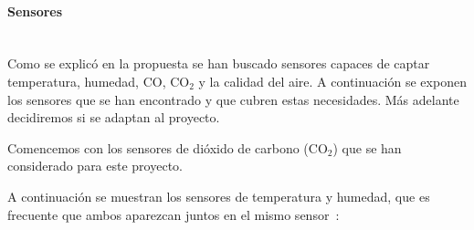 \paragraph{Sensores}\mbox{} \\
Como se explicó en la propuesta se han buscado sensores capaces de captar temperatura, humedad, CO, CO$_2$ y la calidad del aire. A continuación se exponen los sensores que se han encontrado y que cubren estas necesidades. Más adelante decidiremos si se adaptan al proyecto.

Comencemos con los sensores de dióxido de carbono (CO$_2$) que se han considerado para este proyecto.

\begin{table}[H]
	\centering
	\caption{Comparación sensores CO$_2$}
	\label{tab:comp_co2}
\end{table}

A continuación se muestran los sensores de temperatura y humedad, que es frecuente que ambos aparezcan juntos en el mismo sensor~\cite{randomnerdtutorials_comparing_2019}:


